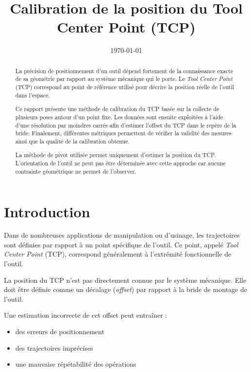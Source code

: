 \documentclass[a4paper,11pt]{article}
\title{\textbf{Calibration de la position du Tool Center Point (TCP)}}
\date{\today}
\begin{document}
\maketitle

\begin{abstract}

La précision de positionnement d’un outil dépend fortement de la connaissance exacte de sa géométrie par rapport au système mécanique qui le porte.  
Le \textit{Tool Center Point} (TCP) correspond au point de référence utilisé pour décrire la position réelle de l’outil dans l’espace.

Ce rapport présente une méthode de calibration du TCP basée sur la collecte de plusieurs poses autour d’un point fixe.
Les données sont ensuite exploitées à l’aide d’une résolution par moindres carrés afin d’estimer l’offset du TCP dans le repère de la bride.  
Finalement, différentes métriques permettent de vérifier la validité des mesures ainsi que la qualité de la calibration obtenue.

La méthode de pivot utilisée permet uniquement d’estimer la position du TCP.
L’orientation de l’outil ne peut pas être déterminée avec cette approche car aucune contrainte géométrique ne permet de l’observer.

\end{abstract}

\tableofcontents
\newpage

\section{Introduction}

Dans de nombreuses applications de manipulation ou d’usinage, les trajectoires sont définies par rapport à un point spécifique de l’outil.  
Ce point, appelé \textit{Tool Center Point} (TCP), correspond généralement à l’extrémité fonctionnelle de l’outil.

La position du TCP n’est pas directement connue par le système mécanique.  
Elle doit être définie comme un décalage (\textit{offset}) par rapport à la bride de montage de l’outil.

Une estimation incorrecte de cet offset peut entraîner :

\begin{itemize}
\item des erreurs de positionnement
\item des trajectoires imprécises
\item une mauvaise répétabilité des opérations
\end{itemize}
\end{document}
